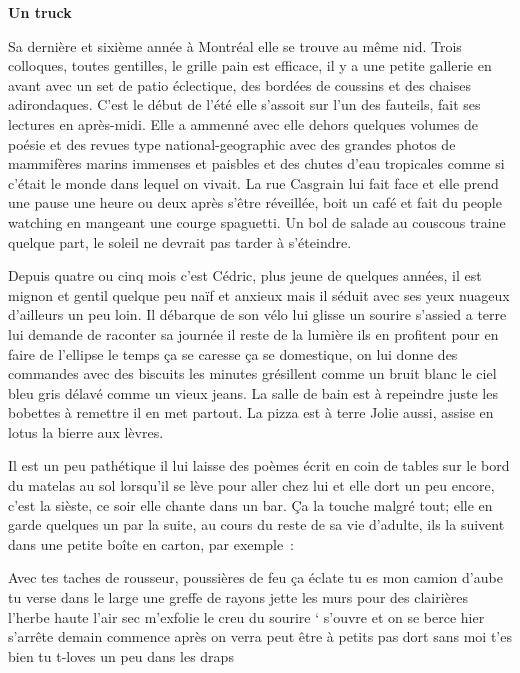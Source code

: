 


\usepackage[utf8]{inputenc}
\usepackage{lmodern}
 \renewcommand{\familydefault}{\sfdefault} 

\textbf{Un truck}

Sa dernière et sixième année à Montréal elle se trouve au même nid. Trois
colloques, toutes gentilles, le grille pain est efficace, il y a une petite
gallerie en avant avec un set de patio éclectique, des bordées de coussins et
des chaises adirondaques. C’est le début de l’été elle s’assoit sur l’un des
fauteils, fait ses lectures en après-midi. Elle a ammenné avec elle dehors
quelques volumes de poésie et des revues type national-geographic avec des
grandes photos de mammifères marins immenses et paisbles et des chutes d’eau
tropicales comme si c’était le monde dans lequel on vivait. La rue Casgrain lui
fait face et elle prend une pause une heure ou deux après s'être
réveillée, boit un café et fait du people watching en mangeant une courge
spaguetti. Un bol de salade au couscous traine quelque part, le soleil ne devrait
pas tarder à s'éteindre.



Depuis quatre ou cinq mois c’est Cédric, plus jeune de quelques années, il est
mignon et gentil quelque peu naïf et anxieux mais il séduit avec ses yeux
nuageux d’ailleurs un peu loin. Il débarque de son vélo lui glisse un sourire
s'assied a terre lui demande de raconter sa journée il reste de la lumière
ils en profitent pour en faire de l'ellipse le temps ça se caresse ça se
domestique, on lui donne des commandes avec des biscuits les minutes grésillent
comme un bruit blanc le ciel bleu gris délavé comme un vieux jeans. La salle de bain est 
à repeindre juste les bobettes à remettre il en met partout. La pizza est à terre Jolie
aussi, assise en lotus la bierre aux lèvres. 


Il est un peu pathétique il lui laisse des poèmes écrit en coin de tables 
sur le bord du matelas au sol lorsqu'il se lève pour aller chez lui et elle
dort un peu encore, c'est la sièste, ce soir elle chante dans un bar. Ça la
touche malgré tout; elle en garde quelques un par la suite, au cours du reste
de sa vie d’adulte, ils la suivent
dans une petite boîte en carton, par exemple :
\begin{flushright}
Avec tes taches de rousseur, poussières de feu
ça éclate tu es mon camion d’aube tu
verse dans le large une greffe de rayons
jette les murs pour des clairières
l’herbe haute l’air sec m’exfolie
le creu du sourire
‘ s’ouvre et on se berce hier s’arrête
demain commence après on verra
peut être
à petits pas
dort sans moi t’es bien
tu t-loves un peu dans les draps
\end{flushright}

